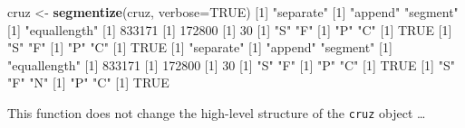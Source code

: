\documentclass[
]{book}
\newenvironment{Shaded}{\begin{snugshade}}{\end{snugshade}}
\newcommand{\DataTypeTok}[1]{\textcolor[rgb]{0.13,0.29,0.53}{#1}}
\newcommand{\DecValTok}[1]{\textcolor[rgb]{0.00,0.00,0.81}{#1}}
\newcommand{\KeywordTok}[1]{\textcolor[rgb]{0.13,0.29,0.53}{\textbf{#1}}}
\newcommand{\NormalTok}[1]{#1}
\newcommand{\OperatorTok}[1]{\textcolor[rgb]{0.81,0.36,0.00}{\textbf{#1}}}
\newcommand{\OtherTok}[1]{\textcolor[rgb]{0.56,0.35,0.01}{#1}}
\newcommand{\StringTok}[1]{\textcolor[rgb]{0.31,0.60,0.02}{#1}}
\begin{document}
\begin{Shaded}
\begin{Highlighting}[]
\NormalTok{cruz <-}\StringTok{ }\KeywordTok{segmentize}\NormalTok{(cruz, }\DataTypeTok{verbose=}\OtherTok{TRUE}\NormalTok{)}
\NormalTok{[}\DecValTok{1}\NormalTok{] }\StringTok{"separate"}
\NormalTok{[}\DecValTok{1}\NormalTok{] }\StringTok{"append"}  \StringTok{"segment"}
\NormalTok{[}\DecValTok{1}\NormalTok{] }\StringTok{"equallength"}
\NormalTok{[}\DecValTok{1}\NormalTok{] }\DecValTok{833171}
\NormalTok{[}\DecValTok{1}\NormalTok{] }\DecValTok{172800}
\NormalTok{[}\DecValTok{1}\NormalTok{] }\DecValTok{30}
\NormalTok{[}\DecValTok{1}\NormalTok{] }\StringTok{"S"} \StringTok{"F"}
\NormalTok{[}\DecValTok{1}\NormalTok{] }\StringTok{"P"} \StringTok{"C"}
\NormalTok{[}\DecValTok{1}\NormalTok{] }\OtherTok{TRUE}
\NormalTok{[}\DecValTok{1}\NormalTok{] }\StringTok{"S"} \StringTok{"F"}
\NormalTok{[}\DecValTok{1}\NormalTok{] }\StringTok{"P"} \StringTok{"C"}
\NormalTok{[}\DecValTok{1}\NormalTok{] }\OtherTok{TRUE}
\NormalTok{[}\DecValTok{1}\NormalTok{] }\StringTok{"separate"}
\NormalTok{[}\DecValTok{1}\NormalTok{] }\StringTok{"append"}  \StringTok{"segment"}
\NormalTok{[}\DecValTok{1}\NormalTok{] }\StringTok{"equallength"}
\NormalTok{[}\DecValTok{1}\NormalTok{] }\DecValTok{833171}
\NormalTok{[}\DecValTok{1}\NormalTok{] }\DecValTok{172800}
\NormalTok{[}\DecValTok{1}\NormalTok{] }\DecValTok{30}
\NormalTok{[}\DecValTok{1}\NormalTok{] }\StringTok{"S"} \StringTok{"F"}
\NormalTok{[}\DecValTok{1}\NormalTok{] }\StringTok{"P"} \StringTok{"C"}
\NormalTok{[}\DecValTok{1}\NormalTok{] }\OtherTok{TRUE}
\NormalTok{[}\DecValTok{1}\NormalTok{] }\StringTok{"S"} \StringTok{"F"} \StringTok{"N"}
\NormalTok{[}\DecValTok{1}\NormalTok{] }\StringTok{"P"} \StringTok{"C"}
\NormalTok{[}\DecValTok{1}\NormalTok{] }\OtherTok{TRUE}
\end{Highlighting}
\end{Shaded}

This function does not change the high-level structure of the \texttt{cruz} object \ldots{}

\begin{Shaded}
\end{Shaded}
\end{document}
